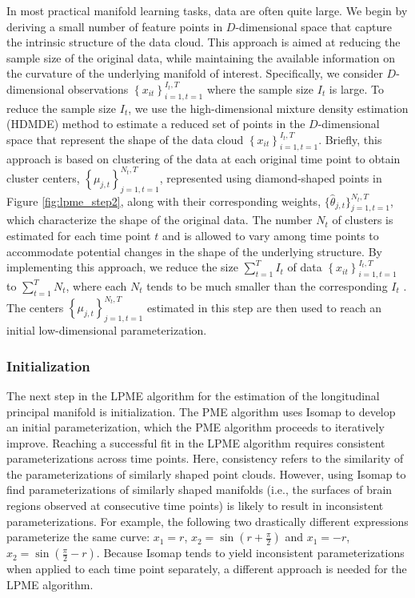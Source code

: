 \documentclass[12pt]{article}
\theoremstyle{definition}
\begin{document}
In most practical manifold learning tasks, data are often quite large. We begin by deriving a small number of feature points in $D$-dimensional space that capture the intrinsic structure of the data cloud. This approach is aimed at reducing the sample size of the original data, while maintaining the available information on the curvature of the underlying manifold of interest. Specifically, we consider $D$-dimensional observations $\left\{x_{it}\right\}_{i=1, t=1}^{I_t, T}$ where the sample size $I_t$ is large. To reduce the sample size $I_t$, we use the high-dimensional mixture density estimation (HDMDE) method \citep[see][alg. 1]{meng2021Principal} to estimate a reduced set of points in the $D$-dimensional space that represent the shape of the data cloud $\left\{x_{it}\right\}_{i=1, t=1}^{I_t, T}$. Briefly, this approach is based on clustering of the data at each original time point to obtain cluster centers, $\left\{\mu_{j, t}\right\}_{j=1, t=1}^{N_t, T}$, represented using diamond-shaped points in Figure \ref{fig:lpme_step2}, along with their corresponding weights, $\{\hat{\theta}_{j, t}\}_{j=1, t=1}^{N_t, T}$, which characterize the shape of the original data. The number $N_t$ of clusters is estimated for each time point $t$ and is allowed to vary among time points to accommodate potential changes in the shape of the underlying structure. By implementing this approach, we reduce the size $\sum_{t=1}^T I_t$ of data $\left\{x_{it}\right\}_{i=1, t=1}^{I_t, T}$ to $\sum_{t=1}^T N_t$, where each $N_t$ tends to be much smaller than the corresponding $I_t$ \citep[see the simulation study presented in][fig. 3(c)]{meng2021Principal}. The centers $\left\{\mu_{j, t}\right\}_{j=1, t=1}^{N_t, T}$ estimated in this step are then used to reach an initial low-dimensional parameterization.

\subsubsection{Initialization}

The next step in the LPME algorithm for the estimation of the longitudinal principal manifold is initialization. The PME algorithm uses Isomap \citep{tenenbaum2000Global} to develop an initial parameterization, which the PME algorithm proceeds to iteratively improve. Reaching a successful fit in the LPME algorithm requires consistent parameterizations across time points. Here, consistency refers to the similarity of the parameterizations of similarly shaped point clouds. However, using Isomap to find parameterizations of similarly shaped manifolds (i.e., the surfaces of brain regions observed at consecutive time points) is likely to result in inconsistent parameterizations. For example, the following two drastically different expressions parameterize the same curve: $x_1 = r$, $x_2 = \sin(r + \frac{\pi}{2})$ and $x_1 = -r$, $x_2 = \sin(\frac{\pi}{2} - r)$. Because Isomap tends to yield inconsistent parameterizations when applied to each time point separately, a different approach is needed for the LPME algorithm.
\end{document}
